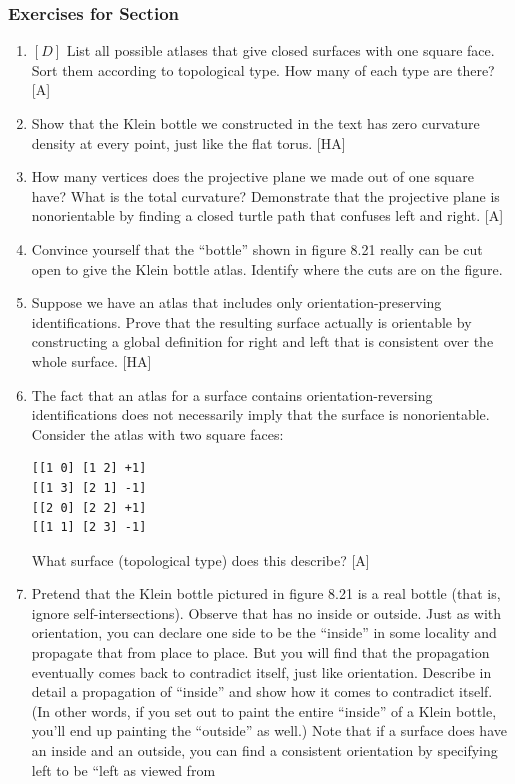\documentclass{book}
\begin{document}
\subsubsection{Exercises for Section \thesection}
\begin{enumerate}
\item $[D]$ List all possible atlases that give closed surfaces with one square
face. Sort them according to topological type. How many of each type
are there? [A]
\item Show that the Klein bottle we constructed in the text has zero
curvature density at every point, just like the flat torus. [HA]
\item How many vertices does the projective plane we made out of one
square have? What is the total curvature? Demonstrate that the projective plane is nonorientable by finding a closed turtle path that confuses
left and right. [A]
\item Convince yourself that the ``bottle'' shown in figure 8.21 really can
be cut open to give the Klein bottle atlas. Identify where the cuts are
on the figure.
\item Suppose we have an atlas that includes only orientation-preserving
identifications. Prove that the resulting surface actually is orientable by
constructing a global definition for right and left that is consistent over
the whole surface. [HA]
\item The fact that an atlas for a surface contains orientation-reversing
identifications does not necessarily imply that the surface is nonorientable. Consider the atlas with two square faces:
\begin{verbatim}
[[1 0] [1 2] +1]
[[1 3] [2 1] -1]
[[2 0] [2 2] +1]
[[1 1] [2 3] -1]
\end{verbatim}What surface (topological type) does this describe? [A]
\item Pretend that the Klein bottle pictured in figure 8.21 is a real bottle
(that is, ignore self-intersections). Observe that has no inside or outside.
Just as with orientation, you can declare one side to be the ``inside'' in
some locality and propagate that from place to place. But you will find
that the propagation eventually comes back to contradict itself, just like
orientation. Describe in detail a propagation of ``inside'' and show how
it comes to contradict itself. (In other words, if you set out to paint the
entire ``inside'' of a Klein bottle, you'll end up painting the ``outside'' as
well.) Note that if a surface does have an inside and an outside, you can
find a consistent orientation by specifying left to be ``left as viewed from

\end{enumerate}
\end{document}
